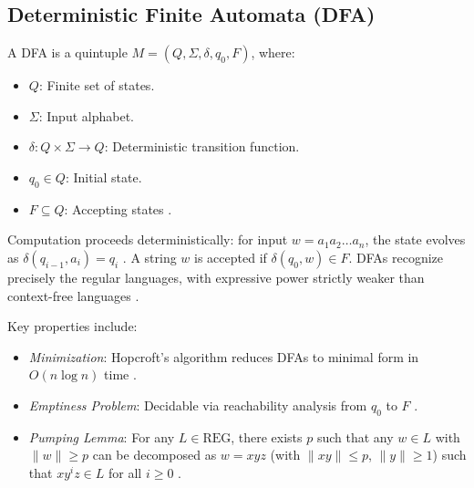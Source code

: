 
\subsection{Deterministic Finite Automata (DFA)}
\label{subsec:dfa} 

A DFA is a quintuple $M = (Q, \Sigma, \delta, q_0, F)$, where:
\begin{itemize}
    \item $Q$: Finite set of states.
    \item $\Sigma$: Input alphabet.
    \item $\delta: Q \times \Sigma \to Q$: Deterministic transition function.
    \item $q_0 \in Q$: Initial state.
    \item $F \subseteq Q$: Accepting states \cite{hopcroft2006introduction}.
\end{itemize} 

Computation proceeds deterministically: for input $w = a_1 a_2 \dots a_n$, the state evolves as $\delta(q_{i-1}, a_i) = q_i$ \cite{hopcroft2006introduction}. A string $w$ is accepted if $\delta(q_0, w) \in F$. DFAs recognize precisely the regular languages, with expressive power strictly weaker than context-free languages \cite{hopcroft2006introduction}. 

Key properties include:
\begin{itemize}
    \item \textit{Minimization}: Hopcroft's algorithm reduces DFAs to minimal form in $O(n \log n)$ time \cite{hopcroft2006introduction}.
    \item \textit{Emptiness Problem}: Decidable via reachability analysis from $q_0$ to $F$ \cite{hopcroft2006introduction}.
    \item \textit{Pumping Lemma}: For any $L \in \text{REG}$, there exists $p$ such that any $w \in L$ with $\|w\| \geq p$ can be decomposed as $w = xyz$ (with $\|xy\| \leq p$, $\|y\| \geq 1$) such that $xy^i z \in L$ for all $i \geq 0$ \cite{hopcroft2006introduction}.
\end{itemize} 

\newpage
